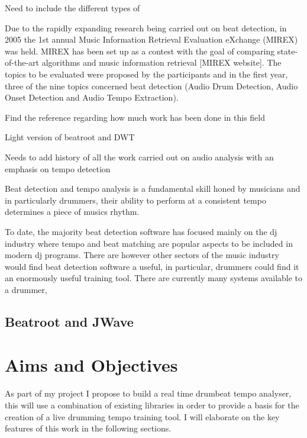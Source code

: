 \documentclass[a4paper, 11pt]{article}
\begin{document}
Need to include the different types of 

Due to the rapidly expanding research being carried out on beat detection, in 2005 the 1st annual Music Information Retrieval Evaluation eXchange (MIREX) was held. MIREX has been set up as a contest with the goal of comparing state-of-the-art algorithms and music information retrieval [MIREX website]. The topics to be evaluated were proposed by the participants and in the first year, three of the nine topics concerned beat detection (Audio Drum Detection, Audio Onset Detection and Audio Tempo Extraction).  

Find the reference regarding how much work has been done in this field

Light version of beatroot and DWT

Needs to add history of all the work carried out on audio analysis with an emphasis on tempo detection

Beat detection and tempo analysis is a fundamental skill honed by musicians and in particularly drummers, their ability to perform at a consistent tempo determines a piece of musics rhythm. 

To date, the majority beat detection software has focused mainly on the dj industry where tempo and beat matching are popular aspects to be included in modern dj programs. There are however other sectors of the music industry would find beat detection software a useful, in particular, drummers could find it an enormously useful training tool. There are currently many systems available to a drummer, 




\subsection{Beatroot and JWave}

\maketitle{} \section{Aims and Objectives}

As part of my project I propose to build a real time drumbeat tempo analyser, this will use a combination of existing libraries in order to provide a basis for the creation of a live drumming tempo training tool. I will elaborate on the key features of this work in the following sections.
\end{document}
